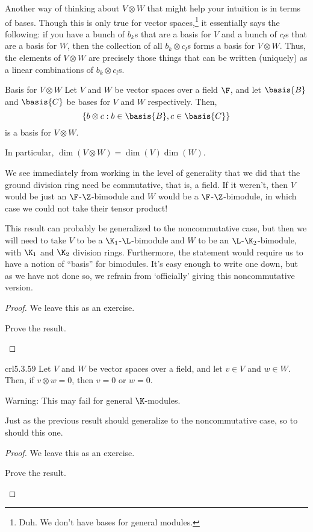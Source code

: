 Another way of thinking about $V\otimes W$ that might help your intuition is in terms of bases.  Though this is only true for vector spaces,\footnote{Duh.  We don't have bases for general modules.} it essentially says the following:  if you have a bunch of $b_k$s that are a basis for $V$ and a bunch of $c_l$s that are a basis for $W$, then the collection of all $b_k\otimes c_l$s forms a basis for $V\otimes W$.  Thus, the elements of $V\otimes W$ are precisely those things that can be written (uniquely) as a linear combinations of $b_k\otimes c_l$s.
\begin{prp}{Basis for $V\otimes W$}{}
	Let $V$ and $W$ be vector spaces over a field $\F$, and let $\basis{B}$ and $\basis{C}$ be bases for $V$ and $W$ respectively.  Then,
	\begin{equation}
	\left\{ b\otimes c:b\in \basis{B},c\in \basis{C}\right\}
	\end{equation}
	is a basis for $V\otimes W$.
	\begin{rmk}
		In particular, $\dim (V\otimes W)=\dim (V)\dim (W)$.
	\end{rmk}
	\begin{rmk}
		We see immediately from working in the level of generality that we did that the ground division ring need be commutative, that is, a field.  If it weren't, then $V$ would be just an $\F$-$\Z$-bimodule and $W$ would be a $\F$-$\Z$-bimodule, in which case we could not take their tensor product!
	\end{rmk}
	\begin{rmk}
		This result can probably be generalized to the noncommutative case, but then we will need to take $V$ to be a $\K _1$-$\L$-bimodule and $W$ to be an $\L$-$\K _2$-bimodule, with $\K _1$ and $\K _2$ division rings.  Furthermore, the statement would require us to have a notion of ``basis'' for bimodules.  It's easy enough to write one down, but as we have not done so, we refrain from `officially' giving this noncommutative version.
	\end{rmk}
	\begin{proof}
		We leave this as an exercise.
		\begin{exr}[breakable=false]{}{}
			Prove the result.
		\end{exr}
	\end{proof}
\end{prp}
\begin{crl}{}{crl5.3.59}
	Let $V$ and $W$ be vector spaces over a field, and let $v\in V$ and $w\in W$.  Then, if $v\otimes w=0$, then $v=0$ or $w=0$.
	\begin{rmk}
		Warning:  This may fail for general $\K$-modules.
	\end{rmk}
	\begin{rmk}
		Just as the previous result should generalize to the noncommutative case, so to should this one.
	\end{rmk}
	\begin{proof}
		We leave this as an exercise.
		\begin{exr}[breakable=false]{}{}
			Prove the result.
		\end{exr}
	\end{proof}
\end{crl}

